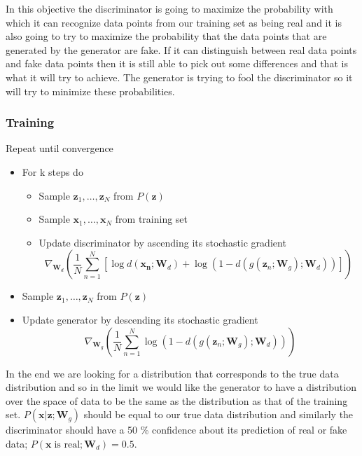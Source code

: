 \documentclass[12pt]{article}
\begin{document}
        In this objective the discriminator is going to maximize the probability with which it can recognize data points
        from our training set as being real and it is also going to try to maximize the probability that the data points
        that are generated by the generator are fake. If it can distinguish between real data points and fake data
        points then it is still able to pick out some differences and that is what it will try to achieve. The generator
        is trying to fool the discriminator so it will try to minimize these probabilities.

        \subsubsection{Training}
            Repeat until convergence
            \begin{itemize}
                \item For k steps do \begin{itemize}
                    \item Sample $\boldsymbol{z}_{1}, \ldots, \boldsymbol{z}_{N}$ from $P(\boldsymbol{z})$
                    \item Sample $\boldsymbol{x}_{1}, \ldots, \boldsymbol{x}_{N}$ from training set
                    \item Update discriminator by ascending its stochastic gradient 
                    $$ \nabla_{\boldsymbol{W}_{d}}\left(\frac{1}{N} \sum_{n=1}^{N}\left[\log
                    d\left(\boldsymbol{x}_{\boldsymbol{n}} ; \boldsymbol{W}_{d}\right)+\log
                    \left(1-d\left(g\left(\mathbf{z}_{n} ; \boldsymbol{W}_{g}\right) ;
                    \boldsymbol{W}_{d}\right)\right)\right]\right) $$
                \end{itemize}
                \item Sample $\boldsymbol{z}_{1}, \ldots, \boldsymbol{z}_{N}$ from $P(\boldsymbol{z})$
                \item Update generator by descending its stochastic gradient
                $$ \nabla_{\boldsymbol{W}_{g}}\left(\frac{1}{N} \sum_{n=1}^{N} \log \left(1-d\left(g\left(\mathbf{z}_{n} ;
                \boldsymbol{W}_{g}\right) ; \boldsymbol{W}_{d}\right)\right)\right) $$
            \end{itemize}

            In the end we are looking for a distribution that corresponds to the true data distribution and so in the
            limit we would like the generator to have a distribution over the space of data to be the same as the
            distribution as that of the training set. $P(\boldsymbol{x}|\boldsymbol{z}; \boldsymbol{W}_g)$ should be
            equal to our true data distribution and similarly the discriminator should have a 50 \% confidence about its
            prediction of real or fake data; $P(\boldsymbol{x} \; \text{is real}; \boldsymbol{W}_d) = 0.5$.
            
\end{document}
